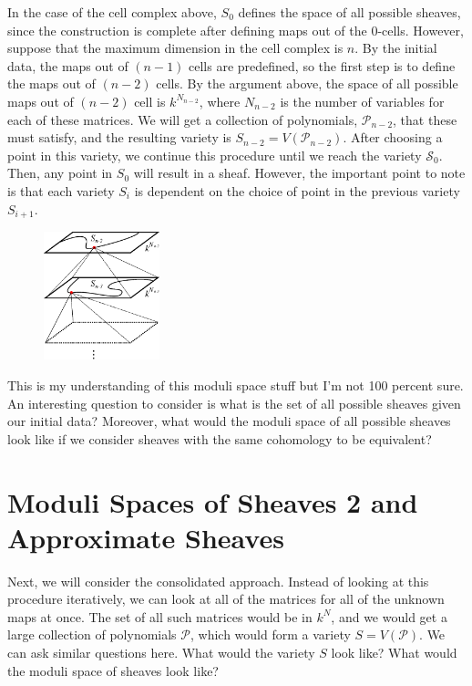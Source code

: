 \documentclass{article}
\newcommand{\cP}{\mathcal{P}}
\newcommand{\cS}{\mathcal{S}}
\newcommand{\clr}{\color{red}}
\theoremstyle{definition}
\begin{document}
In the case of the cell complex above, $S_0$ defines the space of all possible sheaves, since the construction is complete after defining maps out of the $0$-cells. However, suppose that the maximum dimension in the cell complex is $n$. By the initial data, the maps out of $(n-1)$ cells are predefined, so the first step is to define the maps out of $(n-2)$ cells. By the argument above, the space of all possible maps out of $(n-2)$ cell is $k^{N_{n-2}}$, where $N_{n-2}$ is the number of variables for each of these matrices. We will get a collection of polynomials, $\cP_{n-2}$, that these must satisfy, and the resulting variety is $S_{n-2} = V(\cP_{n-2})$. After choosing a point in this variety, we continue this procedure until we reach the variety $\cS_0$. Then, any point in $S_0$ will result in a sheaf. However, the important point to note is that each variety $S_i$ is dependent on the choice of point in the previous variety $S_{i+1}$. 

\begin{figure}[!htbp]
\centering
	\includegraphics[width=0.3\textwidth]{images/variety2.eps}
\end{figure}

{\clr This is my understanding of this moduli space stuff but I'm not 100 percent sure.} An interesting question to consider is what is the set of all possible sheaves given our initial data? Moreover, what would the moduli space of all possible sheaves look like if we consider sheaves with the same cohomology to be equivalent?

\section{Moduli Spaces of Sheaves 2 and Approximate Sheaves}
Next, we will consider the consolidated approach. Instead of looking at this procedure iteratively, we can look at all of the matrices for all of the unknown maps at once. The set of all such matrices would be in $k^N$, and we would get a large collection of polynomials $\cP$, which would form a variety $S = V(\cP)$. We can ask similar questions here. What would the variety $S$ look like? What would the moduli space of sheaves look like?\\
\end{document}
